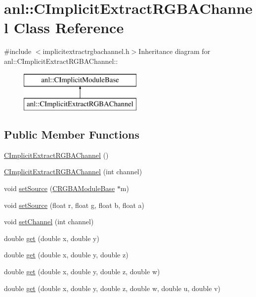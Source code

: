 \hypertarget{classanl_1_1CImplicitExtractRGBAChannel}{
\section{anl::CImplicitExtractRGBAChannel Class Reference}
\label{classanl_1_1CImplicitExtractRGBAChannel}
}


{\ttfamily \#include $<$implicitextractrgbachannel.h$>$}Inheritance diagram for anl::CImplicitExtractRGBAChannel::\begin{figure}[H]
\begin{center}
\leavevmode
\includegraphics[height=2cm]{classanl_1_1CImplicitExtractRGBAChannel}
\end{center}
\end{figure}
\subsection*{Public Member Functions}
\begin{DoxyCompactItemize}
\item 
\hyperlink{classanl_1_1CImplicitExtractRGBAChannel_ae987a5fadcb5571462a26775a68f4966}{CImplicitExtractRGBAChannel} ()
\item 
\hyperlink{classanl_1_1CImplicitExtractRGBAChannel_a05e30ebc5082c29005cefd75c8e902c1}{CImplicitExtractRGBAChannel} (int channel)
\item 
void \hyperlink{classanl_1_1CImplicitExtractRGBAChannel_aab9b09f4de1e342846ec0bff2f636d0f}{setSource} (\hyperlink{classanl_1_1CRGBAModuleBase}{CRGBAModuleBase} $\ast$m)
\item 
void \hyperlink{classanl_1_1CImplicitExtractRGBAChannel_a4b7881dc62acc7eeeb34f041cedbdbd7}{setSource} (float r, float g, float b, float a)
\item 
void \hyperlink{classanl_1_1CImplicitExtractRGBAChannel_a40f3d8750326e262febb032477815ff6}{setChannel} (int channel)
\item 
double \hyperlink{classanl_1_1CImplicitExtractRGBAChannel_a8770c4c419956bfc7a1ddf7e40fe0c66}{get} (double x, double y)
\item 
double \hyperlink{classanl_1_1CImplicitExtractRGBAChannel_ad9ffeeea3e53af27d4c2fd3dc81ea1bc}{get} (double x, double y, double z)
\item 
double \hyperlink{classanl_1_1CImplicitExtractRGBAChannel_a89cec90ae47f3210f1e12f647514d1c2}{get} (double x, double y, double z, double w)
\item 
double \hyperlink{classanl_1_1CImplicitExtractRGBAChannel_a34f8c1bbb5757b600f96ef5bc18f5f70}{get} (double x, double y, double z, double w, double u, double v)
\end{DoxyCompactItemize}
